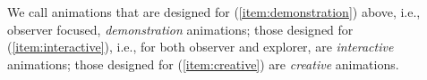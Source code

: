We call animations that are designed for (\ref{item:demonstration}) above, i.e., observer focused,
\emph{demonstration} animations;
those designed for (\ref{item:interactive}), i.e., for both observer and explorer, are
\emph{interactive} animations; those designed for (\ref{item:creative}) are
\emph{creative} animations.


